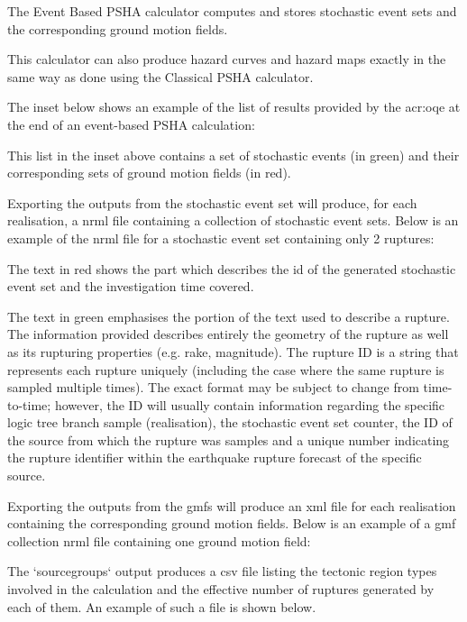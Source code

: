 The Event Based PSHA calculator computes and stores stochastic event sets and
the corresponding ground motion fields.

This calculator can also produce hazard curves and hazard maps exactly in the
same way as done using the Classical PSHA calculator.

The inset below shows an example of the list of results provided by the
\gls{acr:oqe} at the end of an event-based PSHA calculation:



This list in the inset above contains a set of stochastic events (in green)
and their corresponding sets of ground motion fields (in red).

Exporting the outputs from the stochastic event set will produce, for each
realisation, a nrml file containing a collection of stochastic event sets.
Below is an example of the nrml file for a stochastic event set containing
only 2 ruptures:



The text in red shows the part which describes the id of the generated
stochastic event set and the investigation time covered.

The text in green emphasises the portion of the text used to describe a
rupture. The information provided describes entirely the geometry of the
rupture as well as its rupturing properties (e.g. rake, magnitude). The
rupture ID is a string that represents each rupture uniquely (including the
case where the same rupture is sampled multiple times). The exact format may
be subject to change from time-to-time; however, the ID will usually contain
information regarding the specific logic tree branch sample (realisation), the
stochastic event set counter, the ID of the source from which the rupture was
samples and a unique number indicating the rupture identifier within the
earthquake rupture forecast of the specific source.

Exporting the outputs from the gmfs will produce an xml file for each
realisation containing the corresponding ground motion fields. Below is an
example of a gmf collection nrml file containing one ground motion field:



The `sourcegroups` output produces a csv file listing the tectonic region
types involved in the calculation and the effective number of ruptures
generated by each of them. An example of such a file is shown below.


